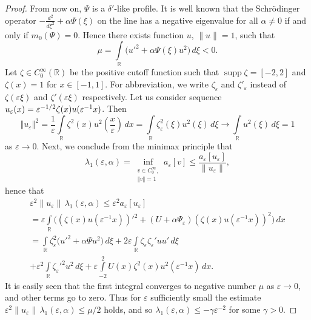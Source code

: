 \documentclass[11pt,english]{amsart}
\begin{document}
\begin{proof}
From now on,  $\Psi$ is a $\delta'$-like profile.
It is well known  \cite[p.~338]{ReedSimonIV} that the Schr\"{o}dinger operator $-\frac{d^2}{d\xi^2}+\alpha\Psi(\xi)$
on the line has  a negative eigenvalue  for all $\alpha\neq 0$ if and only if $m_0(\Psi)=0$.
Hence there exists  function $u$, $\|u\|=1$, such that
\begin{equation*}
    \mu=\int\limits_\mathbb R \bigl(u'^2+\alpha\Psi(\xi)u^2\bigr)\,d\xi<0.
\end{equation*}
Let $\zeta\in C^\infty_0(\mathbb R)$ be the positive  cutoff function such that  $\operatorname{supp} \zeta =[-2,2]$
and $\zeta(x)=1$ for $x\in [-1,1]$.
For abbreviation, we write $\zeta_\varepsilon$ and $\zeta'_\varepsilon$ instead of  $\zeta(\varepsilon\xi)$ and
$\zeta'(\varepsilon\xi)$ respectively. Let us consider  sequence
$u_\varepsilon(x)=\break\varepsilon^{-1/2}\zeta(x)u(\varepsilon^{-1}x)$. Then
 \begin{equation*}
{\left\Vert{u_\varepsilon}\right\Vert}^2=\frac{1}{\varepsilon}\int\limits_\mathbb
R\zeta^2(x)u^2({\textstyle\frac{x}{\varepsilon}})\,dx= \int\limits_\mathbb
R\zeta^2_\varepsilon( \xi)u^2(\xi)\,d\xi\rightarrow \int\limits_\mathbb R u^2(\xi)\,d\xi=1
 \end{equation*}
as $\varepsilon\to 0$. Next, we conclude from the minimax principle  that
\begin{equation*}
    \lambda_1(\varepsilon,\alpha)=\inf\limits_{\substack{v\in
C_0^\infty,\\ {\left\Vert{v}\right\Vert}=1}}a_{\varepsilon}[v]\leq
\frac{a_{\varepsilon}[u_\varepsilon]}{\|u_\varepsilon\|},
\end{equation*}
hence that
\begin{multline*}
\varepsilon^2\|u_\varepsilon\|\,\lambda_1(\varepsilon,\alpha)\leq
\varepsilon^2a_{\varepsilon}[u_\varepsilon]\\
= \varepsilon
\int\limits_\mathbb R\bigl((\zeta(x)u(\varepsilon^{-1}x))'^2+(U+\alpha \Psi_\varepsilon)(\zeta(x)u(\varepsilon^{-1}x))^2\bigr)\,dx\\
=\int\limits_\mathbb R\zeta^2_\varepsilon\bigl(u'^2+\alpha \Psi u^2\bigr)\,d\xi+
2\varepsilon\int\limits_\mathbb R\zeta_\varepsilon\zeta_\varepsilon' u u'\,d\xi\\+
\varepsilon^2\int\limits_\mathbb R\zeta_\varepsilon'^2u^2\,d\xi+
\varepsilon\int\limits_{-2}^2U(x)\zeta^2(x)u^2(\varepsilon^{-1}x)\,dx.
\end{multline*}
It is easily seen that the first integral converges to negative number  $\mu$ as $\varepsilon\to 0$, and  other terms go to zero. Thus for $\varepsilon$  sufficiently small the estimate
 $\varepsilon^2\|u_\varepsilon\|\,\lambda_1(\varepsilon,\alpha)\leq
\mu/2$ holds, and so  $\lambda_1(\varepsilon,\alpha)\leq -\gamma\varepsilon^{-2}$ for some  $\gamma>0$.


\end{proof}
\end{document}
